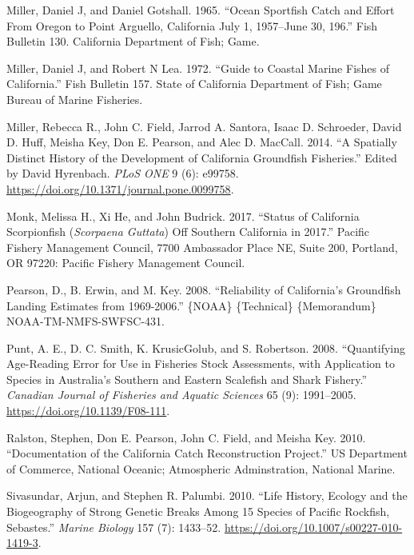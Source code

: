 \documentclass[11pt,
  english,
  letterpaper,
]{article}
\newlength{\cslhangindent}
\newenvironment{CSLReferences}[2] %
 {%
  \setlength{\parindent}{0pt}
  \ifodd #1 \everypar{\setlength{\hangindent}{\cslhangindent}}\ignorespaces\fi
  \ifnum #2 > 0
  \setlength{\parskip}{#2\baselineskip}
  \fi
 }%
 {}
\begin{document}
\begin{CSLReferences}{1}{0}
\leavevmode{}%
Miller, Daniel J, and Daniel Gotshall. 1965. {``Ocean {Sportfish} {Catch} and {Effort} {From} {Oregon} to {Point} {Arguello}, {California} {July} 1, 1957--{June} 30, 196.''} Fish Bulletin 130. California Department of Fish; Game.

\leavevmode{}%
Miller, Daniel J, and Robert N Lea. 1972. {``Guide to Coastal {Marine} {Fishes} of {California}.''} Fish Bulletin 157. State of California Department of Fish; Game Bureau of Marine Fisheries.

\leavevmode{}%
Miller, Rebecca R., John C. Field, Jarrod A. Santora, Isaac D. Schroeder, David D. Huff, Meisha Key, Don E. Pearson, and Alec D. MacCall. 2014. {``A {Spatially} {Distinct} {History} of the {Development} of {California} {Groundfish} {Fisheries}.''} Edited by David Hyrenbach. \emph{PLoS ONE} 9 (6): e99758. \url{https://doi.org/10.1371/journal.pone.0099758}.

\leavevmode{}%
Monk, Melissa H., Xi He, and John Budrick. 2017. {``Status of {California} Scorpionfish (\emph{{Scorpaena} Guttata}) Off Southern {California} in 2017.''} Pacific Fishery Management Council, 7700 Ambassador Place NE, Suite 200, Portland, OR 97220: Pacific Fishery Management Council.

\leavevmode{}%
Pearson, D., B. Erwin, and M. Key. 2008. {``Reliability of {California}'s {Groundfish} {Landing} {Estimates} from 1969-2006.''} \{NOAA\} \{Technical\} \{Memorandum\} NOAA-TM-NMFS-SWFSC-431.

\leavevmode{}%
Punt, A. E., D. C. Smith, K. KrusicGolub, and S. Robertson. 2008. {``Quantifying Age-Reading Error for Use in Fisheries Stock Assessments, with Application to Species in {A}ustralia's Southern and Eastern Scalefish and Shark Fishery.''} \emph{Canadian Journal of Fisheries and Aquatic Sciences} 65 (9): 1991--2005. \url{https://doi.org/10.1139/F08-111}.

\leavevmode{}%
Ralston, Stephen, Don E. Pearson, John C. Field, and Meisha Key. 2010. {``Documentation of the {California} Catch Reconstruction Project.''} US Department of Commerce, National Oceanic; Atmospheric Adminstration, National Marine.

\leavevmode{}%
Sivasundar, Arjun, and Stephen R. Palumbi. 2010. {``Life History, Ecology and the Biogeography of Strong Genetic Breaks Among 15 Species of {Pacific} Rockfish, {Sebastes}.''} \emph{Marine Biology} 157 (7): 1433--52. \url{https://doi.org/10.1007/s00227-010-1419-3}.


\end{CSLReferences}
\end{document}
